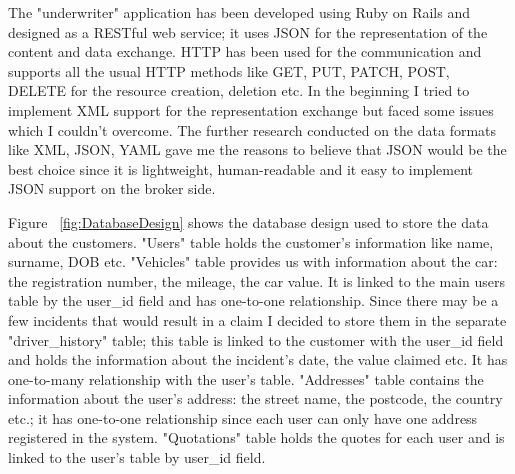 \documentclass[10pt,a4paper,headinclude=true,twoside]{report}
\begin{document}
The "underwriter" application has been developed using Ruby on Rails and designed as a RESTful web service; it uses JSON for the representation of the content and data exchange. HTTP has been used for the communication and supports all the usual HTTP methods like GET, PUT, PATCH, POST, DELETE for the resource creation, deletion etc. In the beginning I tried to implement XML support for the representation exchange but faced some issues which I couldn't overcome. The further research conducted on the data formats like XML, JSON, YAML gave me the reasons to believe that JSON would be the best choice since it is lightweight, human-readable and it easy to implement JSON support on the broker side.

Figure ~\ref{fig:DatabaseDesign} shows the database design used to store the data about the customers. "Users" table holds the customer's information like name, surname, DOB etc. "Vehicles" table provides us with information about the car: the registration number, the mileage, the car value. It is linked to the main users table by the user\_id field and has one-to-one relationship. Since there may be a few incidents that would result in a claim I decided to store them in the separate "driver\_history" table; this table is linked to the customer with the user\_id field and holds the information about the incident's date,  the value claimed etc. It has one-to-many relationship with the user's table. "Addresses" table contains the information about the user's address: the street name, the postcode, the country etc.; it has one-to-one relationship since each user can only have one address registered in the system. "Quotations" table holds the quotes for each user and is linked to the user's table by user\_id field.   
\end{document}
